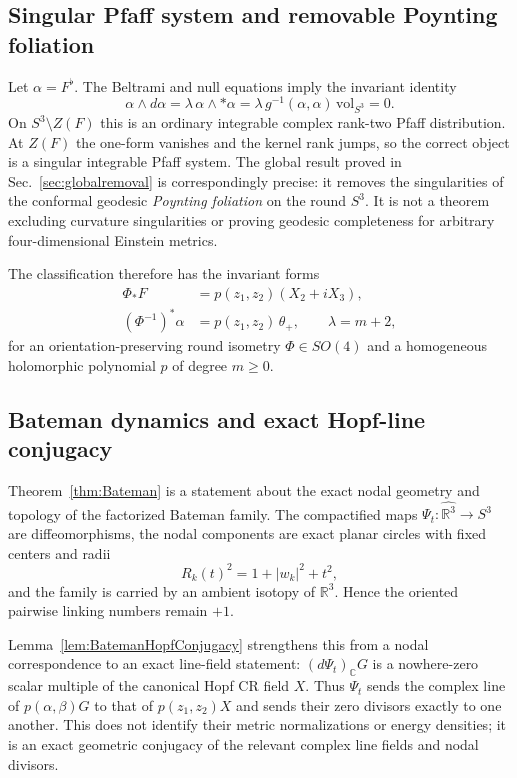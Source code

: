 \documentclass[aps,prd,reprint,nofootinbib,superscriptaddress]{revtex4-2}
\theoremstyle{definition}
\theoremstyle{remark}
\newcommand{\R}{\mathbb{R}}
\begin{document}
\subsection{Singular Pfaff system and removable Poynting foliation}

Let $\alpha=F^\flat$.  The Beltrami and null equations imply the invariant identity
\begin{equation}
\alpha\wedge d\alpha
=\lambda\,\alpha\wedge *\alpha
=\lambda\,g^{-1}(\alpha,\alpha)\,\mathrm{vol}_{S^3}
=0.
\label{eq:architecturePfaff}
\end{equation}
On $S^3\setminus Z(F)$ this is an ordinary integrable complex rank-two Pfaff distribution.  At $Z(F)$ the one-form vanishes and the kernel rank jumps, so the correct object is a singular integrable Pfaff system.  The global result proved in Sec.~\ref{sec:globalremoval} is correspondingly precise: it removes the singularities of the conformal geodesic \emph{Poynting foliation} on the round $S^3$.  It is not a theorem excluding curvature singularities or proving geodesic completeness for arbitrary four-dimensional Einstein metrics.

The classification therefore has the invariant forms
\begin{align}
\Phi_*F&=p(z_1,z_2)(X_2+iX_3),\nonumber\\
(\Phi^{-1})^*\alpha&=p(z_1,z_2)\,\theta_+,
\qquad \lambda=m+2,
\label{eq:architectureBeltrami}
\end{align}
for an orientation-preserving round isometry $\Phi\in SO(4)$ and a homogeneous holomorphic polynomial $p$ of degree $m\ge0$.

\subsection{Bateman dynamics and exact Hopf-line conjugacy}

Theorem~\ref{thm:Bateman} is a statement about the exact nodal geometry and topology of the factorized Bateman family.  The compactified maps $\Psi_t:\widehat{\R^3}\to S^3$ are diffeomorphisms, the nodal components are exact planar circles with fixed centers and radii
\begin{equation}
R_k(t)^2=1+|w_k|^2+t^2,
\end{equation}
and the family is carried by an ambient isotopy of $\R^3$.  Hence the oriented pairwise linking numbers remain $+1$.

Lemma~\ref{lem:BatemanHopfConjugacy} strengthens this from a nodal correspondence to an exact line-field statement: $(d\Psi_t)_{\mathbb C}G$ is a nowhere-zero scalar multiple of the canonical Hopf CR field $X$.  Thus $\Psi_t$ sends the complex line of $p(\alpha,\beta)G$ to that of $p(z_1,z_2)X$ and sends their zero divisors exactly to one another.  This does not identify their metric normalizations or energy densities; it is an exact geometric conjugacy of the relevant complex line fields and nodal divisors.
\end{document}
